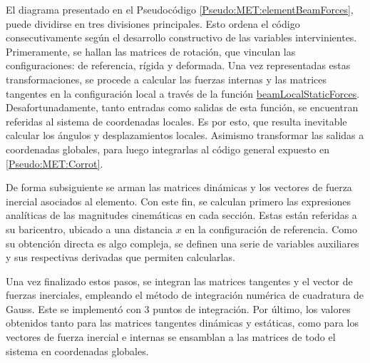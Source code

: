 El diagrama presentado en el Pseudocódigo \ref{Pseudo:MET:elementBeamForces}, puede dividirse en tres divisiones principales. Esto ordena el código consecutivamente según el desarrollo constructivo de las variables intervinientes. Primeramente, se hallan las matrices de rotación, que vinculan las configuraciones: de referencia, rígida y deformada. Una vez representadas estas transformaciones, se procede a calcular las fuerzas internas y las matrices tangentes en la configuración local a través de la función \href{https://github.com/ONSAS/ONSAS/blob/master/src/beamLocalStaticForces.m}{beamLocalStaticForces}. Desafortunadamente, tanto entradas como salidas de esta función, se encuentran referidas al sistema de coordenadas locales. Es por esto, que resulta inevitable calcular los ángulos y desplazamientos locales. Asimismo transformar las salidas a coordenadas globales, para luego integrarlas al código general expuesto en \ref{Pseudo:MET:Corrot}.

De forma subsiguiente se arman las matrices dinámicas y los vectores de fuerza inercial asociados al elemento. Con este fin, se calculan primero las expresiones analíticas de las magnitudes cinemáticas en cada sección. Estas están referidas a su baricentro, ubicado a una distancia $x$ en la configuración de referencia. Como su obtención directa es algo compleja, se definen una serie de variables auxiliares y sus respectivas derivadas que permiten calcularlas.  

Una vez finalizado estos pasos, se integran las matrices tangentes y el vector de fuerzas inerciales, empleando el método de integración numérica de cuadratura de Gauss. Este se implementó con 3 puntos de integración. Por último, los valores obtenidos tanto para las matrices tangentes dinámicas y estáticas, como para los vectores de fuerza inercial e internas se ensamblan a las matrices de todo el sistema en coordenadas globales.

